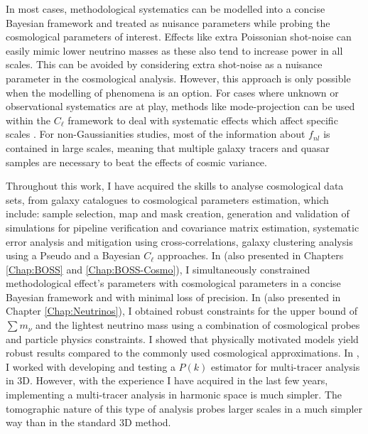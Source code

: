 \qquad In most cases, methodological systematics can be modelled into a concise Bayesian framework and treated as nuisance parameters while probing the cosmological parameters of interest. Effects like extra Poissonian shot-noise can easily mimic lower neutrino masses as these also tend to increase power in all scales. This can be avoided by considering extra shot-noise as a nuisance parameter in the cosmological analysis. However, this approach is only possible when the modelling of phenomena is an option. For cases where unknown or observational systematics are at play, methods like mode-projection can be used within the $C_{\ell}$ framework to deal with systematic effects which affect specific scales \cite{Boris2013}. For non-Gaussianities studies, most of the information about $f_{nl}$ is contained in large scales, meaning that multiple galaxy tracers and quasar samples are necessary to beat the effects of cosmic variance.

\qquad Throughout this work, I have acquired the skills to analyse cosmological data sets, from galaxy catalogues to cosmological parameters estimation, which include: sample selection, map and mask creation, generation and validation of simulations for pipeline verification and covariance matrix estimation, systematic error analysis and mitigation using cross-correlations, galaxy clustering analysis using a Pseudo and a Bayesian $C_{\ell}$ approaches. In \cite{2018LoureiroBOSS} (also presented in Chapters \ref{Chap:BOSS} and \ref{Chap:BOSS-Cosmo}), I simultaneously constrained methodological effect's parameters with cosmological parameters in a concise Bayesian framework and with minimal loss of precision. In \cite{2018LoureiroNeutrinos} (also presented in Chapter \ref{Chap:Neutrinos}), I obtained robust constraints for the upper bound of $\sum m_{\nu}$ and the lightest neutrino mass using a combination of cosmological probes and particle physics constraints. I showed that physically motivated models yield robust results compared to the commonly used cosmological approximations. In \cite{2016AbramoSeccoLoureiro}, I worked with developing and testing a $P(k)$ estimator for multi-tracer analysis in 3D. However, with the experience I have acquired in the last few years, implementing a multi-tracer analysis in harmonic space is much simpler. The tomographic nature of this type of analysis probes larger scales in a much simpler way than in the standard 3D method.

